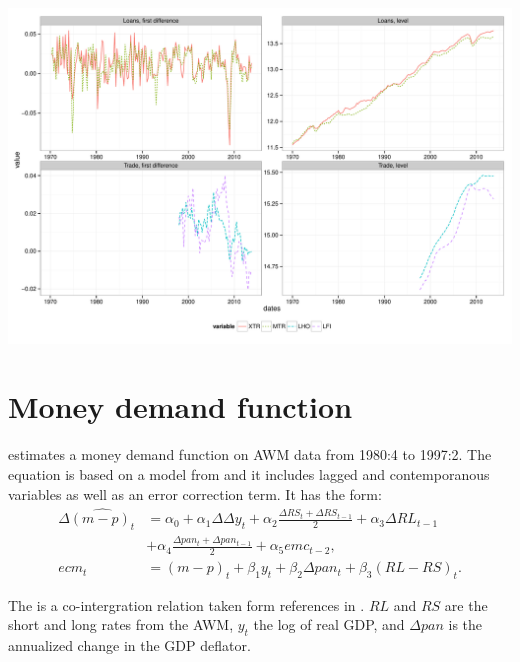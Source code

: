 \documentclass[11pt,oneside, a4paper]{amsart}\usepackage[]{graphicx}\usepackage[]{color}
\newenvironment{knitrout}{}{} %
\begin{document}
\begin{knitrout}
\color{fgcolor}

{\centering \includegraphics[width=\textwidth]{figure/plot_rest-1} 

}



\end{knitrout}

\clearpage
\newpage

\section{Money demand function}

\cite{baardsen2005econometrics} estimates a money demand function on AWM data from 1980:4 to 1997:2. The equation is based on a model from \cite{coenen2001demand} and it includes lagged and contemporanous variables as well as an error correction term. It has the form:
\begin{align*}
\Delta \widehat{\left(m-p\right)_t} &= \alpha_0 + \alpha_1 \Delta \Delta y_t + \alpha_2 \frac{\Delta RS_t + \Delta RS_{t-1}}{2} 
+ \alpha_3 \Delta RL_{t-1} \\
&+ \alpha_4 \frac{\Delta pan_t + \Delta pan_{t-1}}{2} + \alpha_5 emc_{t-2},\\
ecm_t &= (m-p)_t + \beta_1 y_t + \beta_2 \Delta pan_t + \beta_3 (RL-RS)_t.
\end{align*}

The  is a co-intergration relation taken form references in \cite[p. 152]{baardsen2005econometrics}. $RL$ and $RS$ are the short and long rates from the AWM, $y_t$ the log of real GDP, and $\Delta pan$ is the annualized change in the GDP deflator.  
\end{document}
